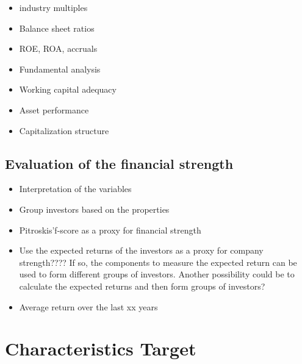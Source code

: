 \documentclass[12pt]{article}
\begin{document}
    \begin{itemize}

        \item industry multiples
        \item Balance sheet ratios
        \item ROE, ROA, accruals 
        \item Fundamental analysis
        \item Working capital adequacy
        \item Asset performance
        \item Capitalization structure

    \end{itemize}
    
\subsection{Evaluation of the financial strength} 
    
    \begin{itemize}

        \item Interpretation of the variables
        \item Group investors based on the properties
        \item Pitroskis'f-score as a proxy for financial strength
        \item Use the expected returns of the investors as a proxy for company strength???? If so, the components to measure the expected return can be used to form different groups of investors. Another possibility could be to calculate the expected returns and then form groups of investors? 
        \item Average return over the last xx years 

    \end{itemize}

\section{Characteristics Target}
\end{document}
